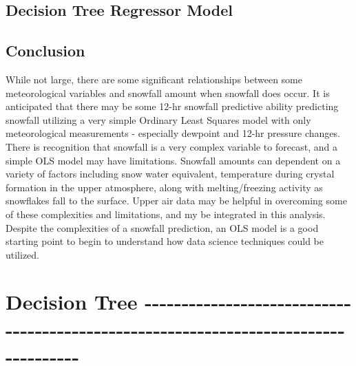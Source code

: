 \documentclass[11pt]{article}
\begin{document}
\subsection{Decision Tree Regressor
Model}\label{decision-tree-regressor-model}

\subsection{Conclusion}\label{conclusion}

While not large, there are some significant relationships between some
meteorological variables and snowfall amount when snowfall does occur.
It is anticipated that there may be some 12-hr snowfall predictive
ability predicting snowfall utilizing a very simple Ordinary Least
Squares model with only meteorological measurements - especially
dewpoint and 12-hr pressure changes. There is recognition that snowfall
is a very complex variable to forecast, and a simple OLS model may have
limitations. Snowfall amounts can dependent on a variety of factors
including snow water equivalent, temperature during crystal formation in
the upper atmosphere, along with melting/freezing activity as snowflakes
fall to the surface. Upper air data may be helpful in overcoming some of
these complexities and limitations, and my be integrated in this
analysis. Despite the complexities of a snowfall prediction, an OLS
model is a good starting point to begin to understand how data science
techniques could be utilized.

\section{Decision Tree
-\/-\/-\/-\/-\/-\/-\/-\/-\/-\/-\/-\/-\/-\/-\/-\/-\/-\/-\/-\/-\/-\/-\/-\/-\/-\/-\/-\/-\/-\/-\/-\/-\/-\/-\/-\/-\/-\/-\/-\/-\/-\/-\/-\/-\/-\/-\/-\/-\/-\/-\/-\/-\/-\/-\/-\/-\/-\/-\/-\/-\/-\/-\/-\/-\/-\/-\/-\/-\/-\/-\/-\/-\/-\/-\/-\/-\/-\/-\/-\/-\/-\/-\/-}\label{decision-tree-------------------------------------------------------------------------------------}
\end{document}
